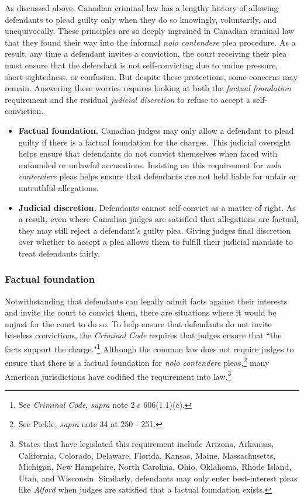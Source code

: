 As discussed above, Canadian criminal law has a lengthy history of allowing defendants to plead guilty only when they do so knowingly, voluntarily, and unequivocally. These principles are so deeply ingrained in Canadian criminal law that they found their way into the informal \textit{nolo contendere} plea procedure. As a result, any time a defendant invites a conviction, the court receiving their plea must ensure that the defendant is not self-convicting due to undue pressure, short-sightedness, or confusion. But despite these protections, some concerns may remain. Answering these worries requires looking at both the \textit{factual foundation} requirement and the residual \textit{judicial discretion} to refuse to accept a self-conviction.

\begin{itemize}
    \item \textbf{Factual foundation.} Canadian judges may only allow a defendant to plead guilty if there is a factual foundation for the charges. This judicial oversight helps ensure that defendants do not convict themselves when faced with unfounded or unlawful accusations. Insisting on this requirement for \textit{nolo contendere} pleas helps ensure that defendants are not held liable for unfair or untruthful allegations.
    \item \textbf{Judicial discretion.} Defendants cannot self-convict as a matter of right. As a result, even where Canadian judges are satisfied that allegations are factual, they may still reject a defendant's guilty plea. Giving judges final discretion over whether to accept a plea allows them to fulfill their judicial mandate to treat defendants fairly.
\end{itemize}

\subsubsection{Factual foundation}

Notwithstanding that defendants can legally admit facts against their interests and invite the court to convict them, there are situations where it would be unjust for the court to do so. To help ensure that defendants do not invite baseless convictions, the \textit{Criminal Code} requires that judges ensure that ``the facts support the charge."\footnote{See \textit{Criminal Code}, \textit{supra} note 2 s 606(1.1)(c).} Although the common law does not require judges to ensure that there is a factual foundation for \textit{nolo contendere} pleas,\footnote{See Pickle, \textit{supra} note 34 at 250 - 251.} many American jurisdictions have codified the requirement into law.\footnote{States that have legislated this requirement include Arizona, Arkansas, California, Colorado, Delaware, Florida, Kansas, Maine, Massachusetts, Michigan, New Hampshire, North Carolina, Ohio, Oklahoma, Rhode Island, Utah, and Wisconsin. Similarly, defendants may only enter best-interest pleas like \textit{Alford} when judges are satisfied that a factual foundation exists.}

